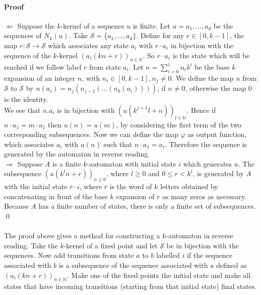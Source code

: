 \documentclass{article}
\begin{document}
\paragraph{Proof}
$\Leftarrow$ Suppose the $k$-kernel of a sequence $u$ is finite. Let
$u = a_1, ..., a_d$ be the sequences of $N_k(u)$. Take
$\mathcal{S} = \{a_1, ..., a_d\}$. Define for any $r \in [0, k - 1]$, the map
$r : \mathcal{S} \rightarrow \mathcal{S}$ which associates any state $a_i$ with
$r \cdot a_i$ in bijection with the sequence of the $k$-kernel
$(a_i(kn + r))_{n \in \mathbb{N}}$. So $r \cdot a_i$ is the state which will be
reached if we follow label $r$ from state $a_i$. Let
$n = \sum_{i = 0}^j n_i k^i$ be the base $k$ expansion of an integer $n$, with
$n_i \in [0, k - 1], n_j \ne 0$.  We define the map $n$ from
$\mathcal{S}$ to $\mathcal{S}$ by $n(a_i) = n_j(n_{j - 1}( ... (n_0(a_i))))$,
if $n \ne 0$, otherwise the map 0 is the identity.\\
We see that $n.a_i$ is in bijection with
$(u(k^{j + 1} l + n))_{l \in \mathbb{N}}$. Hence if $n \cdot a_1 = m \cdot a_1$
then $u(n) = u(m)$, by considering the first term of the two corresponding
subsequences. Now we can define the map $\varphi$ as output function, which
associates $a_i$ with $u(n)$ such that $n \cdot a_1 = a_i$. Therefore the
sequence is generated by the automaton in reverse reading.\\
$\Rightarrow$ Suppose $A$ is a finite $k$-automaton with initial state $i$
which generates $u$. The subsequence $(u(k^ln + r))_{n \ge 0}$, where
$l \ge 0$ and $0 \le r < k^l$, is generated by $A$ with the initial state
$\overline{r} \cdot i$, where $\overline{r}$ is the word of $k$ letters
obtained by concatenating in front of the base $k$ expansion of $r$ as many
zeros as necessary. Because $A$ has a finite number of states, there is only a
finite set of subsequences. \qed\\
\\
The proof above gives a method for constructing a $k$-automaton in reverse
reading. Take the $k$-kernel of a fixed point and let $\mathcal{S}$ be in
bijection with the sequences. Now add transitions from state $a$ to $b$
labelled $i$ if the sequence associated with $b$ is a subsequence of the
sequence associated with $a$ defined as $(a_i(kn + r))_{n \in \mathbb{N}}$.
Make one of the fixed points the initial state and make all states that have
incoming transitions (starting from that initial state) final states.
\end{document}
